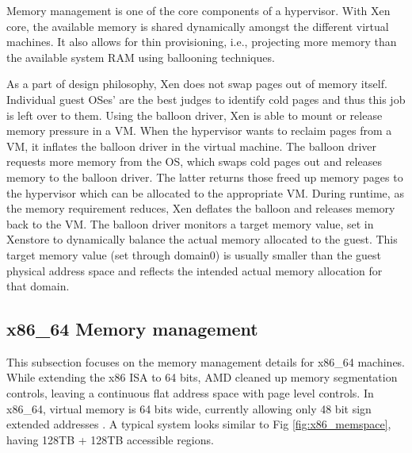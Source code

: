 Memory management is one of the core components of a hypervisor. With Xen core, the available memory is shared dynamically amongst the different virtual machines. It also allows for thin provisioning, i.e., projecting more memory than the available system RAM using ballooning techniques.

As a part of design philosophy, Xen does not swap pages out of memory itself. Individual guest OSes’ are the best judges to identify cold pages and thus this job is left over to them. Using the balloon driver, Xen is able to mount or release memory pressure in a VM. When the hypervisor wants to reclaim pages from a VM, it inflates the balloon driver in the virtual machine. The balloon driver requests more memory from the OS, which swaps cold pages out and releases memory to the balloon driver. The latter returns those freed up memory pages to the hypervisor which can be allocated to the appropriate VM. During runtime, as the memory requirement reduces, Xen deflates the balloon and releases memory back to the VM. The balloon driver monitors a target memory value, set in Xenstore to dynamically balance the actual memory allocated to the guest. This target memory value (set through domain0) is usually smaller than the guest physical address space and reflects the intended actual memory allocation for that domain. 
 

\subsection{x86\_64 Memory management}
This subsection focuses on the memory management details for x86\_64 machines. While extending the x86 ISA to 64 bits, AMD cleaned up memory segmentation controls, leaving a continuous flat address space with page level controls. In x86\_64, virtual memory is 64 bits wide, currently allowing only 48 bit sign extended addresses \cite{intel_manual}. A typical system looks similar to Fig \ref{fig:x86_memspace}, having 128TB + 128TB accessible regions. 

